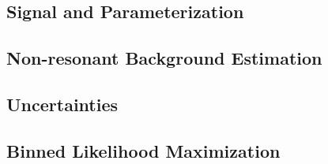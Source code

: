 
\subsection{Signal and \zjets Parameterization}

\subsection{Non-resonant Background Estimation}

\subsection{Uncertainties}

\subsection{Binned Likelihood Maximization}



